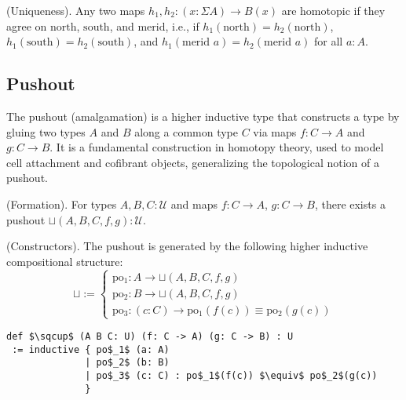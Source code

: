 \begin{theorem} (Uniqueness).
Any two maps \( h_1, h_2 : (x : \Sigma A) \to B(x) \) are homotopic if they agree
on \( \text{north} \), \( \text{south} \), and \( \text{merid} \), i.e.,
if \( h_1(\text{north}) = h_2(\text{north}) \), \( h_1(\text{south}) = h_2(\text{south}) \),
and \( h_1(\text{merid } a) = h_2(\text{merid } a) \) for all \( a : A \).
\end{theorem}

\subsection{Pushout}
The pushout (amalgamation) is a higher inductive type that constructs a type by
gluing two types \( A \) and \( B \) along a common type \( C \) via maps \( f : C \to A \)
and \( g : C \to B \). It is a fundamental construction in homotopy theory,
used to model cell attachment and cofibrant objects, generalizing
the topological notion of a pushout.

\begin{definition} (Formation).
For types \( A, B, C : \mathcal{U} \) and maps \( f : C \to A \), \( g : C \to B \),
there exists a pushout \( \sqcup(A,B,C,f,g) : \mathcal{U} \).
\end{definition}

\begin{definition} (Constructors).
The pushout is generated by the following higher inductive compositional structure:
\[
\sqcup :=
\begin{cases}
\text{po$_1$} : A \to \sqcup(A,B,C,f,g) \\
\text{po$_2$} : B \to \sqcup(A,B,C,f,g) \\
\text{po$_3$} : (c : C) \to \text{po$_1$}(f(c)) \equiv \text{po$_2$}(g(c))
\end{cases}
\]
\begin{lstlisting}[mathescape=true]
def $\sqcup$ (A B C: U) (f: C -> A) (g: C -> B) : U
 := inductive { po$_1$ (a: A)
              | po$_2$ (b: B)
              | po$_3$ (c: C) : po$_1$(f(c)) $\equiv$ po$_2$(g(c))
              }
\end{lstlisting}
\end{definition}

